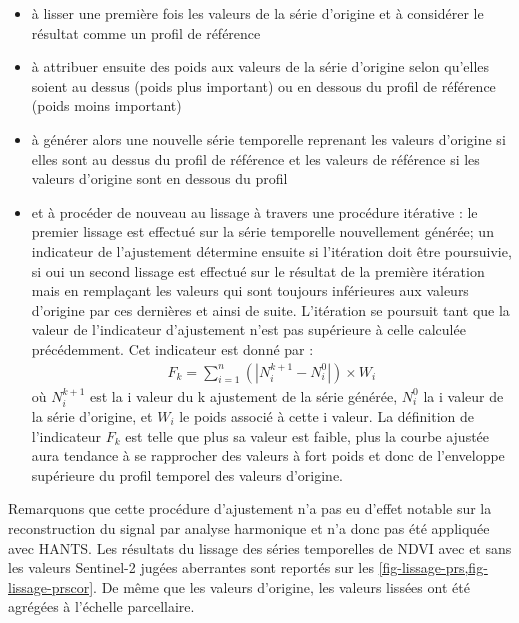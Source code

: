 \begin{itemize}
 \item à lisser une première fois les valeurs de la série d'origine et à considérer le résultat comme un profil de référence 
 \item à attribuer ensuite des poids aux valeurs de la série d'origine selon qu'elles soient au dessus (poids plus important) ou en dessous du profil de référence (poids moins important)
 \item à générer alors une nouvelle série temporelle reprenant les valeurs d'origine si elles sont au dessus du profil de référence et les valeurs de référence si les valeurs d'origine sont en dessous du profil
 \item et à procéder de nouveau au lissage à travers une procédure itérative : le premier lissage est effectué sur la série temporelle nouvellement générée; un indicateur de l'ajustement détermine ensuite si l'itération doit être poursuivie, si oui un second lissage est effectué sur le résultat de la première itération mais en remplaçant les valeurs qui sont toujours inférieures aux valeurs d'origine par ces dernières et ainsi de suite. L'itération se poursuit tant que la valeur de l'indicateur d'ajustement n'est pas supérieure à celle calculée précédemment. Cet indicateur est donné par :
 \begin{align}
   F_{k} = \sum_{i=1}^{n} (|N_{i}^{k+1} - N_{i}^{0}|) \times W_{i}
 \end{align}
 où $N_{i}^{k+1}$ est la i valeur du k ajustement de la série générée, $N_{i}^{0}$ la i valeur de la série d'origine, et $W_{i}$ le poids associé à cette i valeur. La définition de l'indicateur $F_{k}$ est telle que plus sa valeur est faible, plus la courbe ajustée aura tendance à se rapprocher des valeurs à fort poids et donc de l'enveloppe supérieure du profil temporel des valeurs d'origine.
\end{itemize}

\vspace{5mm}

Remarquons que cette procédure d'ajustement n'a pas eu d'effet notable sur la reconstruction du signal par analyse harmonique et n'a donc pas été appliquée avec HANTS. Les résultats du lissage des séries temporelles de NDVI avec et sans les valeurs Sentinel-2 jugées aberrantes sont reportés sur les \cref{fig-lissage-prs,fig-lissage-prscor}. De même que les valeurs d'origine, les valeurs lissées ont été agrégées à l'échelle parcellaire.

